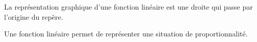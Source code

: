 La représentation graphique d'une fonction linéaire est une droite qui passe
par l'origine du repère.\par\noindent
Une fonction linéaire permet de représenter une situation de proportionnalité.